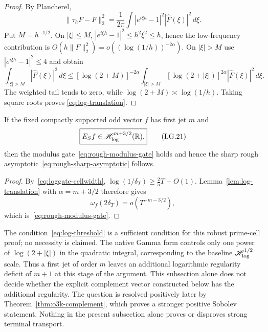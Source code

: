 \begin{proof}
By Plancherel,
\[
 \|\tau_hF-F\|_2^2
 =\frac1{2\pi}\int|e^{i\xi h}-1|^2|\widehat F(\xi)|^2\,d\xi.
\]
Put $M=h^{-1/2}$.  On $|\xi|\le M$,
$|e^{i\xi h}-1|^2\le h^2\xi^2\le h$, hence the low-frequency contribution is
$O(h\|F\|_2^2)=o((\log(1/h))^{-2\alpha})$.  On $|\xi|>M$ use
$|e^{i\xi h}-1|^2\le4$ and obtain
\[
 \int_{|\xi|>M}|\widehat F(\xi)|^2\,d\xi
 \le [\log(2+M)]^{-2\alpha}
 \int_{|\xi|>M}[\log(2+|\xi|)]^{2\alpha}|\widehat F(\xi)|^2\,d\xi.
\]
The weighted tail tends to zero, while
$\log(2+M)\asymp\log(1/h)$.  Taking square roots proves
\eqref{eq:log-translation}.
\end{proof}

\begin{corollary}
\label{cor:log-threshold}
If the fixed compactly supported odd vector $f$ has first jet $m$ and
\[
 \boxed{E_Sf\in\mathscr H_{\log}^{m+3/2}(\mathbb R),}
\tag{LG.21}\label{eq:log-threshold}
\]
then the modulus gate~\eqref{eq:rough-modulus-gate} holds and hence the sharp rough
asymptotic~\eqref{eq:rough-sharp-asymptotic} follows.
\end{corollary}

\begin{proof}
By~\eqref{eq:loggate-cellwidth},
$\log(1/\delta_T)\ge\frac25T-O(1)$.  Lemma~\ref{lem:log-translation} with
$\alpha=m+3/2$ therefore gives
\[
 \omega_f(2\delta_T)=o(T^{-m-3/2}),
\]
which is~\eqref{eq:rough-modulus-gate}.
\end{proof}

\begin{remark}
\label{rem:log-gate-firewall}
The condition~\eqref{eq:log-threshold} is a sufficient condition for this robust
prime-cell proof; no necessity is claimed.  The native Gamma form controls only one
power of $\log(2+|\xi|)$ in the quadratic integral, corresponding to the baseline
$\mathscr H_{\log}^{1/2}$ scale.  Thus a first jet of order $m$ leaves an additional logarithmic
regularity deficit of $m+1$ at this stage of the argument.  This subsection alone does
not decide whether the explicit complement vector constructed below has the additional
regularity.  The question is resolved positively later by
Theorem~\ref{thm:o3k-complement}, which proves a stronger positive Sobolev statement.
Nothing in the present subsection alone proves or disproves strong terminal transport.
\end{remark}